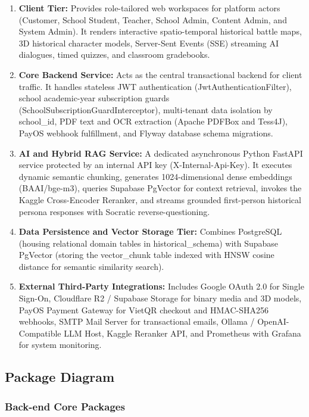 \begin{enumerate}[leftmargin=*]
    \item \textbf{Client Tier:} Provides role-tailored web workspaces for platform actors (Customer, School Student, Teacher, School Admin, Content Admin, and System Admin). It renders interactive spatio-temporal historical battle maps, 3D historical character models, Server-Sent Events (SSE) streaming AI dialogues, timed quizzes, and classroom gradebooks.
    \item \textbf{Core Backend Service:} Acts as the central transactional backend for client traffic. It handles stateless JWT authentication (Jwt\ab Authentication\ab Filter), school academic-year subscription guards (School\ab Subscription\ab Guard\ab Interceptor), multi-tenant data isolation by school\_id, PDF text and OCR extraction (Apache PDFBox and Tess4J), PayOS webhook fulfillment, and Flyway database schema migrations.
    \item \textbf{AI and Hybrid RAG Service:} A dedicated asynchronous Python FastAPI service protected by an internal API key (X-Internal-\ab Api-Key). It executes dynamic semantic chunking, generates 1024-dimensional dense embeddings (BAAI/\ab bge-m3), queries Supabase PgVector for context retrieval, invokes the Kaggle Cross-Encoder Reranker, and streams grounded first-person historical persona responses with Socratic reverse-questioning.
    \item \textbf{Data Persistence and Vector Storage Tier:} Combines PostgreSQL (housing relational domain tables in historical\_\ab schema) with Supabase PgVector (storing the vector\_\ab chunk table indexed with HNSW cosine distance for semantic similarity search).
    \item \textbf{External Third-Party Integrations:} Includes Google OAuth 2.0 for Single Sign-On, Cloudflare R2 / Supabase Storage for binary media and 3D models, PayOS Payment Gateway for VietQR checkout and HMAC-SHA256 webhooks, SMTP Mail Server for transactional emails, Ollama / OpenAI-Compatible LLM Host, Kaggle Reranker API, and Prometheus with Grafana for system monitoring.
\end{enumerate}

\newpage
\subsection{Package Diagram}

\subsubsection{Back-end Core Packages}

